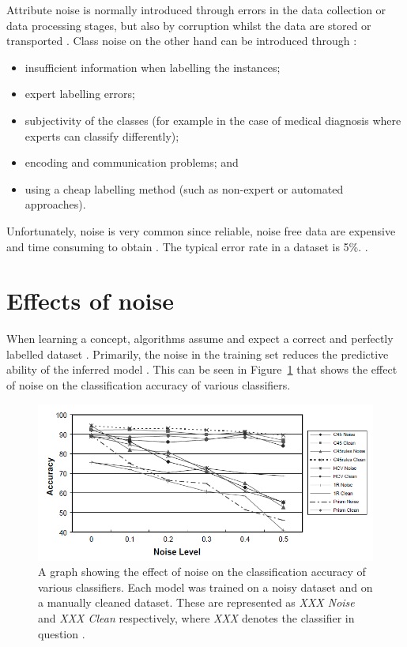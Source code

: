 Attribute noise is normally introduced through errors in the data collection or data processing stages, but also by corruption whilst the data are stored or transported \citep{garcia2013}.  Class noise on the other hand can be introduced through \citep{frenay2014classification}:
\begin{itemize}[-]
	\setlength{\itemsep}{0pt}
  	\setlength{\parskip}{0pt}
  	\setlength{\parsep}{0pt}
	\item insufficient information when labelling the instances;
	\item expert labelling errors; 
	\item subjectivity of the classes (for example in the case of medical diagnosis where experts can classify differently);
	\item encoding and communication problems; and
	\item using a cheap labelling method (such as non-expert or automated approaches). 
\end{itemize}

Unfortunately, noise is very common since reliable, noise free data are expensive and time consuming to obtain \citep{frenay2014classification}. The typical error rate in a dataset is 5\%. \citep{zhu2004class}. 


\section{Effects of noise}\label{sec:noise_effects}

When learning a concept, algorithms assume and expect a correct and perfectly labelled dataset \citep{frenay2014comprehensive}.  Primarily, the noise in the training set reduces the predictive ability of the inferred model \citep{garcia2013, frenay2014comprehensive, frenay2014classification}. This can be seen in Figure~\ref{fig:noise_models} that shows the effect of noise on the classification accuracy of various classifiers.

\begin{figure}
  \includegraphics{graphics/noise_in_datasets/noise_models.png}
  \caption{A graph showing the effect of noise on the classification accuracy of various classifiers. Each model was trained on a noisy dataset and on a manually cleaned dataset. These are represented as \textit{XXX Noise} and \textit{XXX Clean} respectively, where \textit{XXX} denotes the classifier in question \citep{zhu2004class}.}
  \label{fig:noise_models}
\end{figure}

